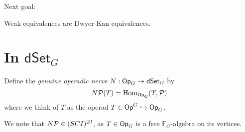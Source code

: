 \documentclass[a4paper,10pt
,draft
]{article}%
\renewcommand{\1}{\ensuremath{\mathbb{id}}}
\begin{document}
Next goal:
\begin{theorem}
      Weak equivalences are Dwyer-Kan equivalences.
\end{theorem}














\newpage

\section{In $\mathsf{dSet}_G$}

\begin{definition}
      Define the \textit{genuine operadic nerve} $N: \Op_G \to \dSet_G$ by
      \begin{equation}
            N\P(T) = \Hom_{\Op_G}(T, \P)
      \end{equation}
      where we think of $T$ as the operad $T \in \Op^G \into \Op_G$. 
\end{definition}

\begin{remark}
      We note that $N\P \in (SCI)^{\boxslash !}$,
      as $T \in \Op_G$ is a free $\mathbb F_G$-algebra on its vertices.
\end{remark}
\end{document}
